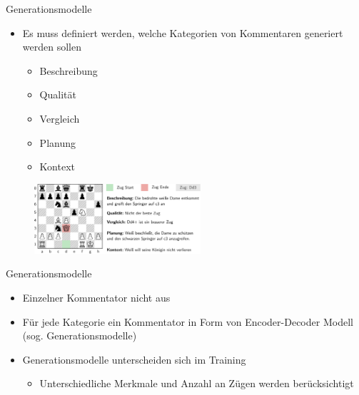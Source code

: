 \begin{frame}{Generationsmodelle}
\begin{itemize}
	\item Es muss definiert werden, welche Kategorien von Kommentaren generiert werden sollen
	\begin{itemize}
		\item Beschreibung
		\item Qualität
		\item Vergleich
		\item Planung
		\item Kontext
	\end{itemize}
\end{itemize}
\begin{figure}
\centering
\includegraphics[width=0.55\textwidth]{graphics/commentator_example/commentator.png}
\end{figure}
\end{frame}




\begin{frame}{Generationsmodelle}
\begin{itemize}
	\item Einzelner Kommentator nicht aus
	\item Für jede Kategorie ein Kommentator in Form von Encoder-Decoder Modell (sog. Generationsmodelle)
	\item Generationsmodelle unterscheiden sich im Training
	\begin{itemize}
		\item Unterschiedliche Merkmale und Anzahl an Zügen werden berücksichtigt
	\end{itemize}
\end{itemize}
\end{frame}





